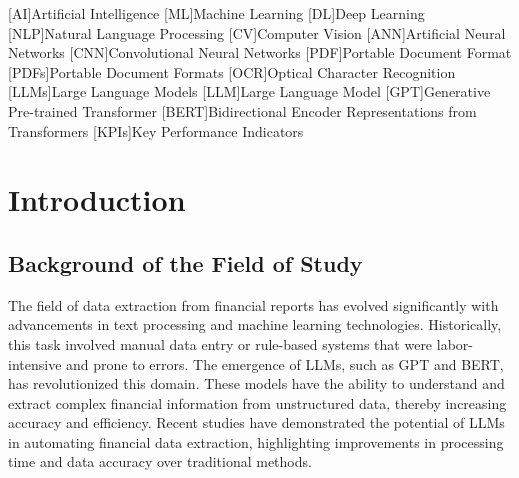 \documentclass[english, 12pt, a4paper, elec, utf8, a-2b, online]{aaltothesis}
\begin{document}
\cleardoublepage

[AI]{Artificial Intelligence}
[ML]{Machine Learning}
[DL]{Deep Learning}
[NLP]{Natural Language Processing}
[CV]{Computer Vision}
[ANN]{Artificial Neural Networks}
[CNN]{Convolutional Neural Networks}
[PDF]{Portable Document Format}
[PDFs]{Portable Document Formats}
[OCR]{Optical Character Recognition}
[LLMs]{Large Language Models}
[LLM]{Large Language Model}
[GPT]{Generative Pre-trained Transformer}
[BERT]{Bidirectional Encoder Representations from Transformers}
[KPIs]{Key Performance Indicators}

\begin{acronym}
\end{acronym}

\section{Introduction}
\label{sec:intro}

\thispagestyle{empty}

\subsection{Background of the Field of Study}

The field of data extraction from financial reports has evolved significantly with advancements in text processing and machine learning technologies. Historically, this task involved manual data entry or rule-based systems that were labor-intensive and prone to errors. The emergence of \ac{LLMs}, such as \ac{GPT} and \ac{BERT}, has revolutionized this domain. These models have the ability to understand and extract complex financial information from unstructured data, thereby increasing accuracy and efficiency. Recent studies have demonstrated the potential of \ac{LLMs} in automating financial data extraction, highlighting improvements in processing time and data accuracy over traditional methods.
\end{document}
